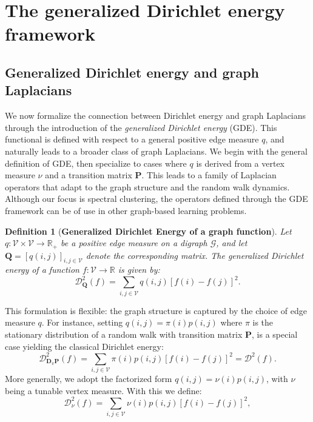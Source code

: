 \documentclass[10pt]{article} %
\def\rmD{{\mathbf{D}}}
\def\rmP{{\mathbf{P}}}
\def\gV{{\mathcal{V}}}
\newcommand{\Q}{\mathbf{Q}}
\newcommand{\q}{q}
\newtheorem{definition}{Definition}[section]
\newcommand{\GDE}{GDE\xspace}
\newcommand{\D}[2]{\mathcal{D}^2_{#1}(#2)}
\begin{document}
\section{The generalized Dirichlet energy framework} \label{sect:gen_dir_en_L}

\subsection{Generalized Dirichlet energy and graph Laplacians}

We now formalize the connection between Dirichlet energy and graph Laplacians through the introduction of the \emph{generalized Dirichlet energy} (\GDE). This functional is defined with respect to a general positive edge measure $\q$, and naturally leads to a broader class of graph Laplacians. We begin with the general definition of \GDE, then specialize to cases where $\q$ is derived from a vertex measure $\nu$ and a transition matrix $\rmP$. This leads to a family of Laplacian operators that adapt to the graph structure and the random walk dynamics. Although our focus is spectral clustering, the operators defined through the \GDE framework can be of use in other graph-based learning problems.
%
\begin{definition}[\textbf{Generalized Dirichlet Energy of a graph function}] \label{def:gen_dir_energy}
  Let $\q : \gV \times \gV \to \mathbb{R}_+$ be a positive edge measure on a digraph $\mathcal{G}$, and let $\Q = [\q(i,j)]_{i,j \in \gV}$ denote the corresponding matrix. The \emph{generalized Dirichlet energy} of a function $f : \gV \to \mathbb{R}$ is given by:
  \begin{equation} \label{full_gen_dir_nrj}
      \D{\Q}{f} = \sum_{i,j \in \gV} \q(i,j) [f(i) - f(j)]^2.
  \end{equation}
\end{definition}
%
This formulation is flexible: the graph structure is captured by the choice of edge measure $\q$. For instance, setting $\q(i,j) = \pi(i)p(i,j)$ where $\pi$ is the stationary distribution of a random walk with transition matrix $\rmP$, is a special case yielding the classical Dirichlet energy:
\begin{equation}
  \D{\rmD_\pi \rmP}{f} = \sum_{i,j \in \gV} \pi(i) p(i,j) [f(i) - f(j)]^2 =  \D{}{f}.
\end{equation}
More generally, we adopt the factorized form $\q(i,j) = \nu(i)p(i,j)$, with $\nu$ being a tunable vertex measure. With this we define:
\begin{equation} \label{eq:dir_en_P}
  \D{\nu}{f} = \sum_{i,j \in \gV} \nu(i)p(i,j)[f(i) - f(j)]^2,
\end{equation}
\end{document}
